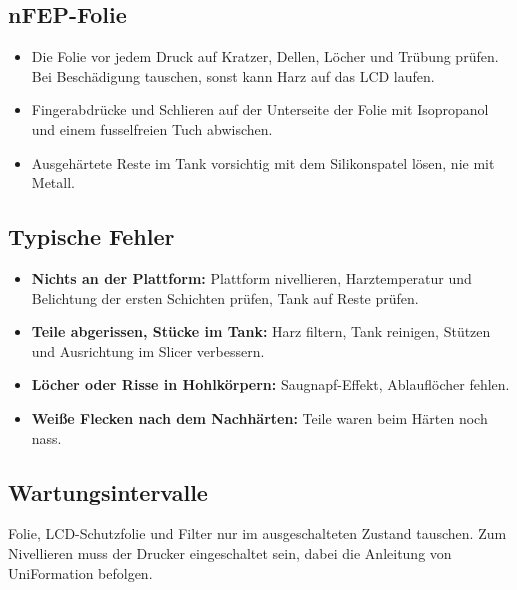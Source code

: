\documentclass{\basedir/fablab-document}
\begin{document}
\subsection{nFEP-Folie}

\begin{itemize}
	\item Die Folie vor jedem Druck auf Kratzer, Dellen, Löcher und Trübung prüfen. Bei Beschädigung tauschen, sonst kann Harz auf das LCD laufen.
	\item Fingerabdrücke und Schlieren auf der Unterseite der Folie mit Isopropanol und einem fusselfreien Tuch abwischen.
	\item Ausgehärtete Reste im Tank vorsichtig mit dem Silikonspatel lösen, nie mit Metall.
\end{itemize}

\subsection{Typische Fehler}

\begin{itemize}
	\item \textbf{Nichts an der Plattform:} Plattform nivellieren, Harztemperatur und Belichtung der ersten Schichten prüfen, Tank auf Reste prüfen.
	\item \textbf{Teile abgerissen, Stücke im Tank:} Harz filtern, Tank reinigen, Stützen und Ausrichtung im Slicer verbessern.
	\item \textbf{Löcher oder Risse in Hohlkörpern:} Saugnapf-Effekt, Ablauflöcher fehlen.
	\item \textbf{Weiße Flecken nach dem Nachhärten:} Teile waren beim Härten noch nass.
\end{itemize}

\subsection{Wartungsintervalle}

Folie, LCD-Schutzfolie und Filter nur im ausgeschalteten Zustand tauschen. Zum Nivellieren muss der Drucker eingeschaltet sein, dabei die Anleitung von UniFormation befolgen.
\end{document}

